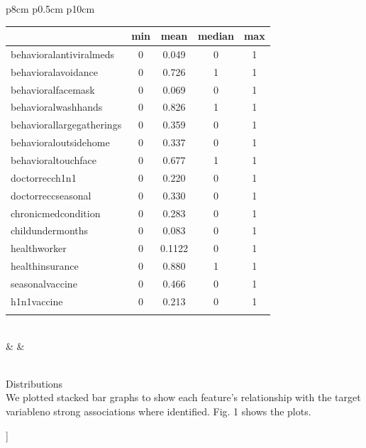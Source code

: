 \documentclass{IEEEtran}
\begin{document}
\begin{@twocolumnfalse}
\begin{center}
{\begin{tabular}{p{8cm} p{0.5cm} p{10cm}}
\begin{tabular}{| l |c|c|c|c|} %
\hline 
& \textbf{min} & \textbf{mean} & \textbf{median} & \textbf{max} \\
\hline 
behavioral\textunderscore antiviral\textunderscore meds & 0 & 0.049 & 0 & 1\\
\hline
behavioral\textunderscore avoidance & 0 & 0.726 & 1 & 1\\
\hline 
behavioral\textunderscore face\textunderscore mask & 0 & 0.069 & 0 & 1\\
\hline 
behavioral\textunderscore wash\textunderscore hands & 0 & 0.826 & 1 & 1\\
\hline 
behavioral\textunderscore large\textunderscore gatherings & 0 & 0.359 & 0 & 1\\
\hline
behavioral\textunderscore outside\textunderscore home & 0 & 0.337 & 0 & 1\\
\hline 
behavioral\textunderscore touch\textunderscore face & 0 & 0.677 & 1 & 1\\
\hline 
doctor\textunderscore recc\textunderscore h1n1 & 0 & 0.220 & 0 & 1\\
\hline 
doctor\textunderscore recc\textunderscore seasonal & 0 & 0.330 & 0 & 1\\
\hline 
chronic\textunderscore med\textunderscore condition & 0 & 0.283 & 0 & 1\\
\hline 
child\textunderscore under\textunderscore 6\textunderscore months & 0 & 0.083 & 0 & 1\\
\hline
health\textunderscore worker & 0 & 0.1122 & 0 & 1\\
\hline
health\textunderscore insurance & 0 & 0.880 & 1 & 1\\
\hline
seasonal\textunderscore vaccine & 0 & 0.466 & 0 & 1\\
\hline
h1n1\textunderscore vaccine & 0 & 0.213 & 0 & 1\\
\hline
\multicolumn{4}{l}{}\\
\end{tabular}\\
& & \\
\\
\end{tabular}%
}
\end{center}
{\huge Distributions}\\
We plotted stacked bar graphs to show each feature's relationship with the target variable\textemdash no strong associations where identified. Fig. 1 shows the plots.
\end{@twocolumnfalse}
]
\end{document}

